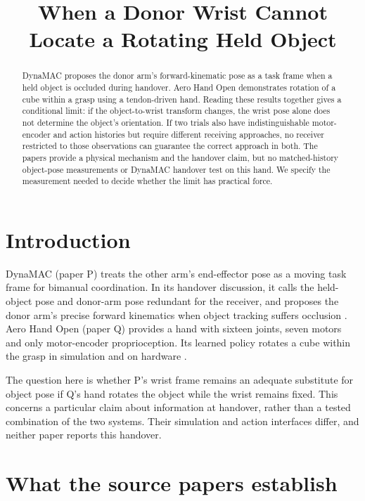 \documentclass{article}
\title{When a Donor Wrist Cannot Locate a Rotating Held Object}
\begin{document}
\maketitle

\begin{abstract}
DynaMAC proposes the donor arm's forward-kinematic pose as a task frame when a held object is occluded during handover.
Aero Hand Open demonstrates rotation of a cube within a grasp using a tendon-driven hand. Reading these results together
gives a conditional limit: if the object-to-wrist transform changes, the wrist pose alone does not determine the
object's orientation. If two trials also have indistinguishable motor-encoder and action histories but require different
receiving approaches, no receiver restricted to those observations can guarantee the correct approach in both. The
papers provide a physical mechanism and the handover claim, but no matched-history object-pose measurements or DynaMAC
handover test on this hand. We specify the measurement needed to decide whether the limit has practical force.
\end{abstract}

\section{Introduction}

DynaMAC (paper P) treats the other arm's end-effector pose as a moving task frame for bimanual coordination. In its
handover discussion, it calls the held-object pose and donor-arm pose redundant for the receiver, and proposes the donor
arm's precise forward kinematics when object tracking suffers occlusion \cite{p}. %
Aero Hand Open (paper Q) provides a hand with sixteen joints, seven motors and only motor-encoder proprioception. Its
learned policy rotates a cube within the grasp in simulation and on hardware \cite{q}. %

The question here is whether P's wrist frame remains an adequate substitute for object pose if Q's hand rotates the
object while the wrist remains fixed. This concerns a particular claim about information at handover, rather than a
tested combination of the two systems. Their simulation and action interfaces differ, and neither paper reports this
handover. %

\section{What the source papers establish}
\end{document}
